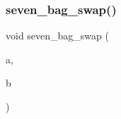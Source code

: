\mbox{\label{seven__bag_8c_a2c3087bc0bfcc740eb24edb2e36f2763}} 
\subsubsection{seven\+\_\+bag\+\_\+swap()}
{\footnotesize\ttfamily void seven\+\_\+bag\+\_\+swap (\begin{DoxyParamCaption}\item[{\textbf{ Piece\+Type} $\ast$}]{a,  }\item[{\textbf{ Piece\+Type} $\ast$}]{b }\end{DoxyParamCaption})}

